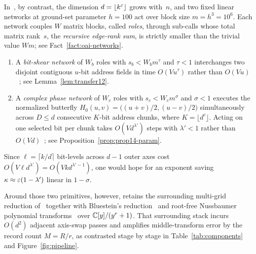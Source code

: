 In~\cite{OAI26}, by contrast, the dimension $d=\lfloor k^\varepsilon\rfloor$ grows with~$n$, and two fixed linear networks at ground-set parameter $h=100$ act over block size $m=h^3=10^6$. Each network couples $W$ matrix blocks, called \emph{roles}, through sub-calls whose total matrix rank~$s$, the \emph{recursive edge-rank sum}, is strictly smaller than the trivial value $Wm$; see Fact~\ref{fact:oai-networks}.
\begin{enumerate}[label=(\roman*),nosep,leftmargin=*]
  \item A \emph{bit-shear network} of $W_b$ roles with $s_b < W_b m^{\tau}$ and $\tau<1$ interchanges two disjoint contiguous $u$-bit address fields in time $O(V u^{\tau})$ rather than $O(V u)$~\cite[Lemma~12]{OAI26}; see Lemma~\ref{lem:transfer12}.

  \item A \emph{complex phase network} of $W_c$ roles with $s_c < W_c m^{\sigma}$ and $\sigma<1$ executes the normalized butterfly $H_0(u,v)=\bigl((u+v)/2,(u-v)/2\bigr)$ simultaneously across $D\le d$ consecutive $K$-bit address chunks, where $K=\lfloor d^c\rfloor$. Acting on one selected bit per chunk takes $O(V d^{\lambda'})$ steps with $\lambda'<1$ rather than $O(V d)$~\cite[Prop.~14]{OAI26}; see Proposition~\ref{prop:prop14-param}.
\end{enumerate}
Since $\ell=\lceil k/d\rceil$ bit-levels across $d-1$ outer axes cost $O(V\ell d^{\lambda'})=O(V k d^{\lambda'-1})$, one would hope for an exponent saving $\kappa\approx\varepsilon(1-\lambda')$ linear in $1-\sigma$.

Around those two primitives, however, \cite{OAI26} retains the surrounding multi-grid reduction of~\cite{HvdH21} together with Bluestein's reduction~\cite{Bluestein70} and root-free Nussbaumer polynomial transforms~\cite{NQ78,Nussbaumer80} over $\mathbb{C}[y]/(y^r+1)$. That surrounding stack incurs $O(d^2)$ adjacent axis-swap passes and amplifies middle-transform error by the record count $M=R/r$, as contrasted stage by stage in Table~\ref{tab:components} and Figure~\ref{fig:pipeline}.

